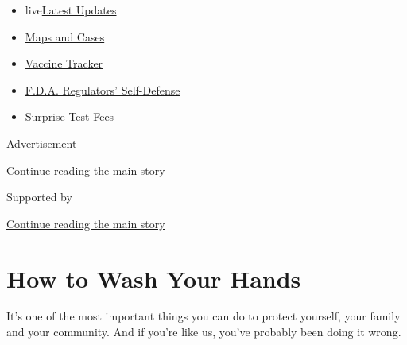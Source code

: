\begin{itemize}
\tightlist
\item
  live\href{https://www.nytimes3xbfgragh.onion/2020/09/11/world/covid-19-coronavirus.html?name=styln-coronavirus-national\&region=TOP_BANNER\&block=storyline_menu_recirc\&action=click\&pgtype=Article\&impression_id=86727b21-f4bc-11ea-b51e-55332169c079\&variant=undefined}{Latest
  Updates}
\item
  \href{https://www.nytimes3xbfgragh.onion/interactive/2020/us/coronavirus-us-cases.html?name=styln-coronavirus-national\&region=TOP_BANNER\&block=storyline_menu_recirc\&action=click\&pgtype=Article\&impression_id=86727b22-f4bc-11ea-b51e-55332169c079\&variant=undefined}{Maps
  and Cases}
\item
  \href{https://www.nytimes3xbfgragh.onion/interactive/2020/science/coronavirus-vaccine-tracker.html?name=styln-coronavirus-national\&region=TOP_BANNER\&block=storyline_menu_recirc\&action=click\&pgtype=Article\&impression_id=86727b23-f4bc-11ea-b51e-55332169c079\&variant=undefined}{Vaccine
  Tracker}
\item
  \href{https://www.nytimes3xbfgragh.onion/2020/09/10/us/politics/fda-coronavirus-vaccine.html?name=styln-coronavirus-national\&region=TOP_BANNER\&block=storyline_menu_recirc\&action=click\&pgtype=Article\&impression_id=86727b24-f4bc-11ea-b51e-55332169c079\&variant=undefined}{F.D.A.
  Regulators' Self-Defense}
\item
  \href{https://www.nytimes3xbfgragh.onion/2020/09/09/upshot/coronavirus-surprise-test-fees.html?name=styln-coronavirus-national\&region=TOP_BANNER\&block=storyline_menu_recirc\&action=click\&pgtype=Article\&impression_id=8672a230-f4bc-11ea-b51e-55332169c079\&variant=undefined}{Surprise
  Test Fees}
\end{itemize}

Advertisement

\protect\hyperlink{after-top}{Continue reading the main story}

Supported by

\protect\hyperlink{after-sponsor}{Continue reading the main story}

\hypertarget{how-to-wash-your-hands}{%
\section{How to Wash Your Hands}\label{how-to-wash-your-hands}}

It's one of the most important things you can do to protect yourself,
your family and your community. And if you're like us, you've probably
been doing it wrong.

